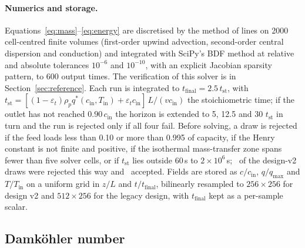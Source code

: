 \paragraph{Numerics and storage.}
Equations~\eqref{eq:mass}--\eqref{eq:energy} are discretised by the method of lines on
2000 cell-centred finite volumes (first-order upwind advection, second-order central
dispersion and conduction) and integrated with SciPy's BDF method at relative and
absolute tolerances \(10^{-6}\) and \(10^{-10}\), with an explicit Jacobian sparsity
pattern, to 600 output times. The verification of this solver is in
Section~\ref{sec:reference}.
Each run is integrated to \(t_{\mathrm{final}} = 2.5\,t_{\mathrm{st}}\), with
\(t_{\mathrm{st}} = [(1-\varepsilon_t)\rho_p q^{*}(c_{\mathrm{in}},T_{\mathrm{in}}) + \varepsilon_t c_{\mathrm{in}}]\,L/(v c_{\mathrm{in}})\)
the stoichiometric time; if the outlet has not reached \(0.90\,c_{\mathrm{in}}\) the
horizon is extended to 5, 12.5 and 30 \(t_{\mathrm{st}}\) in turn and the run is
rejected only if all four fail.
Before solving, a draw is rejected if the feed loads less than 0.10 or more than 0.995
of capacity, if the Henry constant is not finite and positive, if the isothermal
mass-transfer zone spans fewer than five solver cells, or if \(t_{\mathrm{st}}\) lies
outside 60\,s to \(2\times10^{6}\)\,s; \nDataNrejected\ of the design-v2 draws were
rejected this way and \nDataNsamples\ accepted.
Fields are stored as \(c/c_{\mathrm{in}}\), \(q/q_{\max}\) and \(T/T_{\mathrm{in}}\) on a
uniform grid in \(z/L\) and \(t/t_{\mathrm{final}}\), bilinearly resampled to
\(256\times256\) for design v2 and \(512\times256\) for the legacy design, with
\(t_{\mathrm{final}}\) kept as a per-sample scalar.

\subsection*{Damk\"ohler number}

